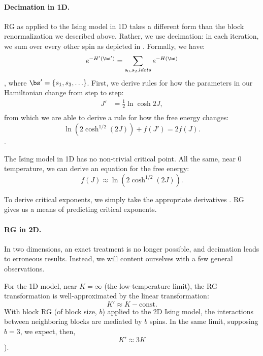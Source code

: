 \paragraph{Decimation in 1D.} RG as applied to the Ising model in 1D
takes a different form than the block renormalization we described
above. Rather, we use decimation: in each iteration, we sum over every
other spin as depicted in . Formally, we have:%
\begin{equation}%
  e^{-H'(\bs')}=\sum_{s_0,s_2,ldots} e^{-H(\bs)}
\end{equation},%
where $\bs'=\{s_1,s_3,\ldots\}$. First, we derive
rules for how the parameters in our Hamiltonian change from step to
step:%
\begin{align}%
  J'&= \frac{1}{2}\ln \cosh 2J \label{eq:ising-1d-recursion-relation-J},\\
\end{align}%
from which we are able to derive a rule for how the free energy
changes:%
\begin{equation}%
  \ln \left( 2 \cosh^{1/2}(2J)\right) + f(J')=2 f(J).\label{eq:decimation-f-transformation}
\end{equation}.%

The Ising model in 1D has no non-trivial critical point.  All the
same, near $0$ temperature, we can derive an equation for
the free energy:
\begin{equation}%
  f(J)\approx \ln \left( 2 \cosh^{1/2}(2J)\right).
\end{equation}%

To derive critical exponents, we simply take the appropriate
derivatives . RG gives us a means of predicting
critical exponents.

\paragraph{RG in 2D.} In two dimensions, an exact treatment is no
longer possible, and decimation leads to erroneous results. Instead,
we will content ourselves with a few general observations.

For the 1D model, near $K=\infty$ (the low-temperature limit), the RG
transformation  is
well-approximated by the linear transformation:
\begin{equation}%
  K'\approx K- \text{const}.
\end{equation}%
With block RG (of block size, $b$) applied to the 2D Ising model, the
interactions between neighboring blocks are mediated by $b$ spins. In
the same limit, supposing $b=3$, we expect, then,%
\begin{equation}%
  K'\approx 3 K
\end{equation}%
).

